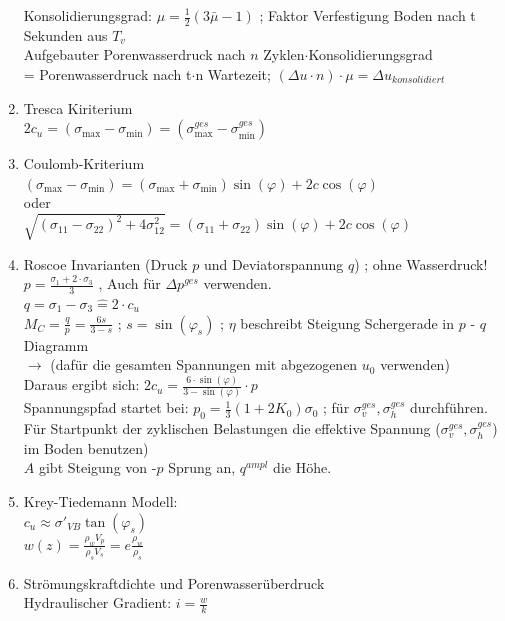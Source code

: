 \documentclass[fleqn,twoside]{article}
\begin{document}
\begin{enumerate}
		Konsolidierungsgrad: $\mu=\frac{1}{2}(3\bar{\mu}-1)$ ; Faktor Verfestigung Boden nach t Sekunden aus $T_v$\\
		Aufgebauter Porenwasserdruck nach $n$ Zyklen$\cdot$Konsolidierungsgrad \\= Porenwasserdruck nach t$\cdot$n Wartezeit; 
		$(\Delta u \cdot n) \cdot \mu = \Delta u_{konsolidiert}$
\item Tresca Kiriterium\\
		$2c_u = (\sigma_{\max}-\sigma_{\min})=(\sigma_{\max}^{ges}-\sigma_{\min}^{ges})$
\item Coulomb-Kriterium\\
		$(\sigma_{\max}-\sigma_{\min})=(\sigma_{\max}+\sigma_{\min})\sin(\varphi)+2c\cos(\varphi)$\\
		oder\\
		$\sqrt{(\sigma_{11}-\sigma_{22})^2+4\sigma^{2}_{12}}=(\sigma_{11}+\sigma_{22})\sin(\varphi)+2c\cos(\varphi)$
\item Roscoe Invarianten (Druck $p$ und Deviatorspannung $q$) ; ohne Wasserdruck!\\
		$p=\frac{\sigma_1+2\cdot\sigma_3}{3}$ , Auch für $\Delta p^{ges}$ verwenden.\\
		$q=\sigma_1-\sigma_3 \widehat{=} 2 \cdot c_u$\\
		$M_C=\frac{q}{p} = \frac{6s}{3-s}$ ; $s=\sin(\varphi_s)$ ; $\eta$ beschreibt Steigung Schergerade in $p$ - $q$ Diagramm \\
		$\rightarrow$ (dafür die gesamten Spannungen mit abgezogenen $u_0$ verwenden)\\
		Daraus ergibt sich: $2c_u=\frac{6 \cdot \sin(\varphi)}{3-\sin(\varphi)} \cdot p$\\
		Spannungspfad startet bei: $p_0 = \frac{1}{3} (1+2K_0)\sigma_0$ ; für $\sigma_v^{ges},\sigma_h^{ges}$ durchführen.\\
		Für Startpunkt der zyklischen Belastungen die effektive Spannung ($\sigma_v^{ges},\sigma_h^{ges}$) im Boden benutzen)\\
		$A$ gibt Steigung von -$p$ Sprung an, $q^{ampl}$ die Höhe.
\item Krey-Tiedemann Modell:\\
		$c_u \approx \sigma'_{VB} \tan(\varphi_s)$\\
		$w(z)= \frac{\rho_w V_p}{\rho_s V_s}=e \frac{\rho_w}{\rho_s}$
\item Strömungskraftdichte und Porenwasserüberdruck\\
		Hydraulischer Gradient: $i=\frac{w}{k}$\\

\end{enumerate}
\end{document}

